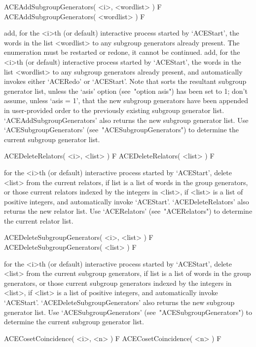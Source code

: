 \>ACEAddSubgroupGenerators( <i>, <wordlist> ) F
\>ACEAddSubgroupGenerators( <wordlist> ) F

add, for the <i>th (or default) interactive {\ACE} process started  by
`ACEStart',  the  words  in  the  list  <wordlist>  to  any   subgroup
generators already present.  The  enumeration  must  be  restarted  or
redone, it cannot be  continued.  add,  for  the  <i>th  (or  default)
interactive {\ACE} process started by `ACEStart',  the  words  in  the
list <wordlist>  to  any  subgroup  generators  already  present,  and
automatically invokes either `ACERedo' or `ACEStart'. Note that {\ACE}
sorts the resultant subgroup generator list, unless the `asis'  option
(see~"option asis") has been set to 1; don't assume,  unless  `asis  =
1',  that  the  new  subgroup  generators  have   been   appended   in
user-provided order to  the  previously  existing  subgroup  generator
list.  `ACEAddSubgroupGenerators'  also  returns  the   new   subgroup
generator          list.          Use          `ACESubgroupGenerators'
(see~"ACESubgroupGenerators")  to  determine  the   current   subgroup
generator list.

\>ACEDeleteRelators( <i>, <list> ) F
\>ACEDeleteRelators( <list> ) F

for the <i>th (or  default)  interactive  {\ACE}  process  started  by
`ACEStart', delete <list> from the current relators, if list is a list
of words in the group generators, or those current relators indexed by
the integers in <list>, if <list> is a list of positive integers,  and
automatically invoke `ACEStart'. `ACEDeleteRelators' also returns  the
new relator list. Use `ACERelators' (see~"ACERelators")  to  determine
the current relator list.

\>ACEDeleteSubgroupGenerators( <i>, <list> ) F
\>ACEDeleteSubgroupGenerators( <list> ) F

for the <i>th (or  default)  interactive  {\ACE}  process  started  by
`ACEStart', delete <list> from the  current  subgroup  generators,  if
list is a list of words in the  group  generators,  or  those  current
subgroup generators indexed by the integers in <list>, if <list> is  a
list  of  positive  integers,  and  automatically  invoke  `ACEStart'.
`ACEDeleteSubgroupGenerators' also returns the new subgroup  generator
list.  Use  `ACESubgroupGenerators'  (see~"ACESubgroupGenerators")  to
determine the current subgroup generator list.

\>ACECosetCoincidence( <i>, <n> ) F
\>ACECosetCoincidence( <n> ) F

